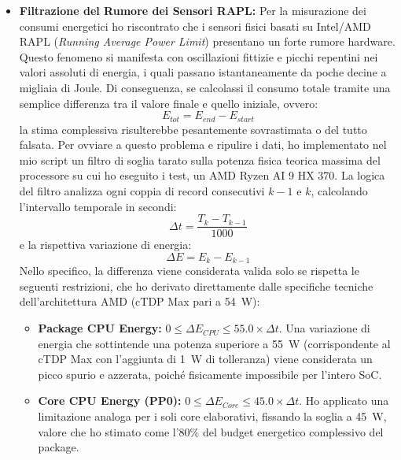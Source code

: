 \begin{itemize}
    \item \textbf{Filtrazione del Rumore dei Sensori RAPL:} Per la misurazione dei consumi energetici ho riscontrato che i sensori fisici basati su Intel/AMD RAPL (\textit{Running Average Power Limit}) presentano un forte rumore hardware. Questo fenomeno si manifesta con oscillazioni fittizie e picchi repentini nei valori assoluti di energia, i quali passano istantaneamente da poche decine a migliaia di Joule. Di conseguenza, se calcolassi il consumo totale tramite una semplice differenza tra il valore finale e quello iniziale, ovvero:
    \begin{equation}
    E_{tot} = E_{end} - E_{start}
    \end{equation}
    la stima complessiva risulterebbe pesantemente sovrastimata o del tutto falsata. Per ovviare a questo problema e ripulire i dati, ho implementato nel mio script un filtro di soglia tarato sulla potenza fisica teorica massima del processore su cui ho eseguito i test, un AMD Ryzen AI 9 HX 370. La logica del filtro analizza ogni coppia di record consecutivi $k-1$ e $k$, calcolando l'intervallo temporale in secondi:
    \begin{equation}
    \Delta t = \frac{T_k - T_{k-1}}{1000}
    \end{equation}
    e la rispettiva variazione di energia:
    \begin{equation}
    \Delta E = E_k - E_{k-1}
    \end{equation}
    Nello specifico, la differenza viene considerata valida solo se rispetta le seguenti restrizioni, che ho derivato direttamente dalle specifiche tecniche dell'architettura AMD (cTDP Max pari a 54~W):
    \begin{itemize}
        \item \textbf{Package CPU Energy:} $0 \le \Delta E_{CPU} \le 55.0 \times \Delta t$. Una variazione di energia che sottintende una potenza superiore a 55~W (corrispondente al cTDP Max con l'aggiunta di 1~W di tolleranza) viene considerata un picco spurio e azzerata, poiché fisicamente impossibile per l'intero SoC.
        \item \textbf{Core CPU Energy (PP0):} $0 \le \Delta E_{Core} \le 45.0 \times \Delta t$. Ho applicato una limitazione analoga per i soli core elaborativi, fissando la soglia a 45~W, valore che ho stimato come l'80\% del budget energetico complessivo del package.
    \end{itemize}
    

\end{itemize}
